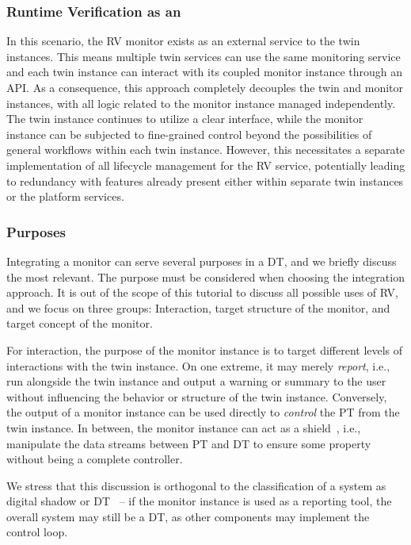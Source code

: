 \subsubsection{Runtime Verification as an \methodthree}
In this scenario, the RV monitor exists as an external service to the twin instances. This means multiple twin services can use the same monitoring service and each twin instance can interact with its coupled monitor instance through an API.
As a consequence, this approach completely decouples the twin and monitor instances, with all logic related to the monitor instance managed independently.
The twin instance continues to utilize a clear interface, while the monitor instance can be subjected to fine-grained control beyond the possibilities of general workflows within each twin instance.
However, this necessitates a separate implementation of all lifecycle management for the RV service, potentially leading to redundancy with features already present either within separate twin instances or the platform services.

\subsubsection{Purposes}
Integrating a monitor can serve several purposes in a DT, and we briefly discuss the most relevant. The purpose must be considered when choosing the integration approach.
It is out of the scope of this tutorial to discuss all possible uses of RV, and we focus on three groups: Interaction, target structure of the monitor, and target concept of the monitor.

For interaction, the purpose of the monitor instance is to target different levels of interactions with the twin instance.
On one extreme, it may merely \emph{report}, i.e., run alongside the twin instance and output a warning or summary to the user without influencing the behavior or structure of the twin instance.
Conversely, the output of a monitor instance can be used directly to \emph{control} the PT from the twin instance.
In between, the monitor instance can act as a  shield~\cite{DBLP:conf/tacas/BloemKKW15}, i.e., manipulate the data streams between PT and DT to ensure some property without being a complete controller.

We stress that this discussion is orthogonal to the classification of a system as digital shadow or DT~\cite{KRITZINGER20181016} -- if the monitor instance is used as a reporting tool, the overall system may still be a DT, as other components may implement the control loop.

